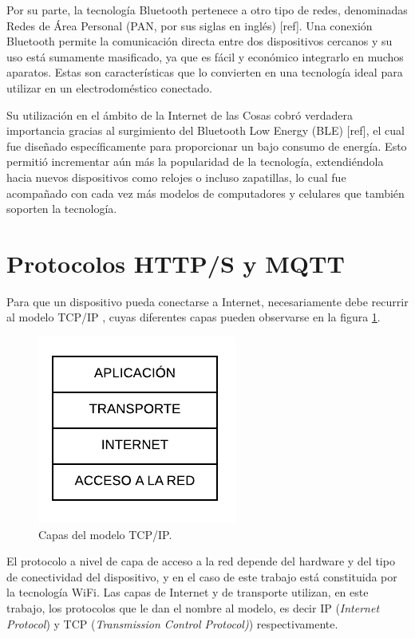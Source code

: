Por su parte, la tecnología Bluetooth pertenece a otro tipo de redes, denominadas Redes de Área Personal (PAN, por sus siglas en inglés) [ref]. Una conexión Bluetooth permite la comunicación directa entre dos dispositivos cercanos y su uso está sumamente masificado, ya que es fácil y económico integrarlo en muchos aparatos. Estas son características que lo convierten en una tecnología ideal para utilizar en un electrodoméstico conectado.

Su utilización en el ámbito de la Internet de las Cosas cobró verdadera importancia gracias al surgimiento del Bluetooth Low Energy (BLE) [ref], el cual fue diseñado específicamente para proporcionar un bajo consumo de energía. Esto permitió incrementar aún más la popularidad de la tecnología, extendiéndola hacia nuevos dispositivos como relojes o incluso zapatillas, lo cual fue acompañado con cada vez más modelos de computadores y celulares que también soporten la tecnología.


\section{Protocolos HTTP/S y MQTT}

Para que un dispositivo pueda conectarse a Internet, necesariamente debe recurrir al modelo TCP/IP \citep{tcp_ip_model}, cuyas diferentes capas pueden observarse en la figura \ref{fig:modelo_tcp_ip}.

\begin{figure}[h]
\centering
\includegraphics{./Figures/modelo_tcp_ip.pdf}
\caption{Capas del modelo TCP/IP.}
\label{fig:modelo_tcp_ip}
\end{figure}

El protocolo a nivel de capa de acceso a la red depende del hardware y del tipo de conectividad del dispositivo, y en el caso de este trabajo está constituida por la tecnología WiFi. Las capas de Internet y de transporte utilizan, en este trabajo, los protocolos que le dan el nombre al modelo, es decir IP (\emph{Internet Protocol}) y TCP (\emph{Transmission Control Protocol)}) respectivamente.

